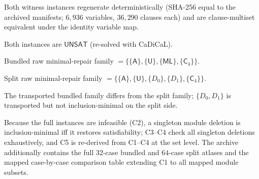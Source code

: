 \documentclass[sigplan,10pt,review,anonymous]{acmart}
\theoremstyle{acmdefinition}
\newcommand{\UNSAT}{\mathsf{UNSAT}}
\newcommand{\ML}{\mathsf{ML}}
\newcommand{\modsym}[1]{\mathsf{#1}}
\begin{document}
\begin{description}[leftmargin=1.4em]
\item[C1] Both witness instances regenerate deterministically (SHA-256 equal
to the archived manifests; $6{,}936$ variables, $36{,}290$ clauses each) and
are clause-multiset equivalent under the identity variable map.
\item[C2] Both instances are $\UNSAT$ (re-solved with CaDiCaL).
\item[C3] Bundled raw minimal-repair family
$= \{\{\modsym{A}\},\{\modsym{U}\},\{\ML\},\{\mathsf{C}_4\}\}$.
\item[C4] Split raw minimal-repair family
$= \{\{\modsym{A}\},\{\modsym{U}\},\{D_0\},\{D_1\},\{\mathsf{C}_4\}\}$.
\item[C5] The transported bundled family differs from the split family;
$\{D_0, D_1\}$ is transported but not inclusion-minimal on the split side.
\end{description}

Because the full instances are infeasible (C2), a singleton module deletion
is inclusion-minimal iff it restores satisfiability; C3--C4 check all
singleton deletions exhaustively, and C5 is re-derived from C1--C4 at the set
level. The archive additionally contains the full $32$-case bundled and
$64$-case split atlases and the mapped case-by-case comparison table
extending C1 to all mapped module subsets.



\end{document}
